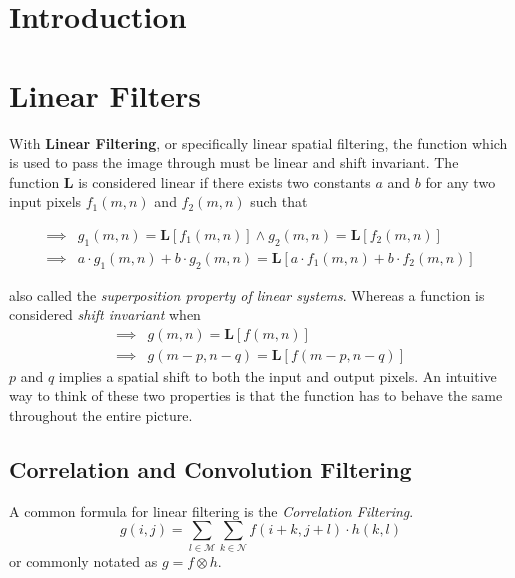 \documentclass[twoside,a4paper,article]{combine}
\begin{document}


\begin{abstract}
\end{abstract}

\tableofcontents
\newpage

\section{Introduction}
\section{Linear Filters}
With \textbf{Linear Filtering}, or specifically linear spatial filtering, the function which is used to pass the image through
must be linear and shift invariant. The function $\pmb{L}$ is considered linear if there exists two constants $a$ and $b$ for any
two input pixels $f_1(m, n)$ and $f_2(m, n)$ such that

\begin{align*}
    \implies & g_1(m, n) = \boldsymbol{L} [f_1(m, n)] \land g_2(m, n) = \boldsymbol{L} [f_2(m, n)] \\
    \implies & a \cdot g_1(m, n) + b \cdot g_2(m, n) = \boldsymbol{L} [a \cdot f_1(m, n) + b \cdot f_2(m, n)]
\end{align*}

also called the \emph{superposition property of linear systems}\cite{BovikActon09}. Whereas a function is considered \emph{shift invariant} when
\begin{align*}
    \implies & g(m, n) = \boldsymbol{L} [f(m, n)]\\
    \implies & g(m - p, n - q) =  \boldsymbol{L} [f(m - p, n - q)]
\end{align*} $p$ and $q$ implies a spatial shift to both the input and output pixels\cite{BovikActon09}. An intuitive way to think
of these two properties is that the function has to behave the same throughout the entire picture.

\subsection{Correlation and Convolution Filtering}
A common formula for linear filtering is the \emph{Correlation Filtering}\cite{BovikActon09}. 
\[
    g(i,j) = \sum_{l \in \mathscr{M}}\sum_{k \in \mathscr{N}}{f(i+k, j+l) \cdot h(k, l)}
\]
or commonly notated as $g = f \otimes h$.
\end{document}
